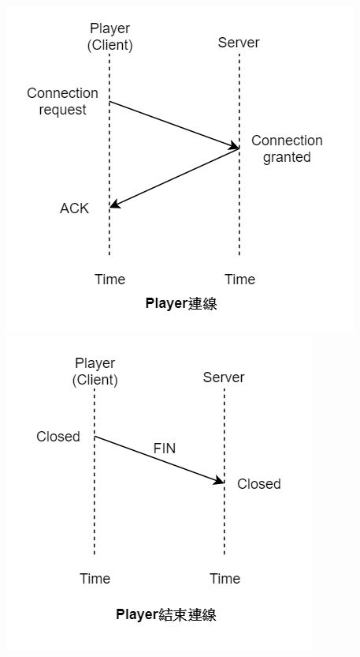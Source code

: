 \documentclass[a0paper,portrait]{baposter}
\begin{document}
\begin{poster}
{\begin{itemize}
\begin{description}
\end{description}

\includegraphics[scale=0.3]{tcp01.JPG}
\includegraphics[scale=0.3]{tcp02.JPG}

\end{itemize}}
\end{poster}
\end{document}
